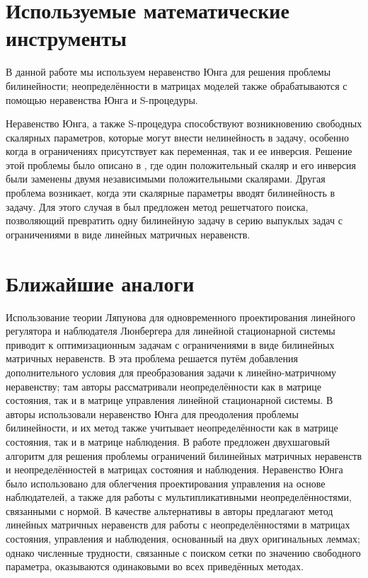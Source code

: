  
\section{Используемые математические инструменты}\label{sec:ch1/sec6}
В данной работе мы используем неравенство Юнга для решения проблемы билинейности; неопределённости в матрицах моделей также обрабатываются с помощью неравенства Юнга и S-процедуры.

Неравенство Юнга, а также S-процедура \cite{Amato2011,LIEN2008} способствуют возникновению свободных скалярных параметров, которые могут внести нелинейность в задачу, особенно когда в ограничениях присутствует как переменная, так и ее инверсия. Решение этой проблемы было описано в \cite{KHELOUFI2016}, где один положительный скаляр и его инверсия были заменены двумя независимыми положительными скалярами. Другая проблема возникает, когда эти скалярные параметры вводят билинейность в задачу. Для этого случая в \cite{KHELOUFI2013} был предложен метод решетчатого поиска, позволяющий превратить одну билинейную задачу в серию выпуклых задач с ограничениями в виде линейных матричных неравенств.

\section{Ближайшие аналоги}\label{sec:ch1/sec7}
Использование теории Ляпунова для одновременного проектирования линейного регулятора и наблюдателя Люнбергера для линейной стационарной системы приводит к оптимизационным задачам с ограничениями в виде билинейных матричных неравенств. В \cite{LIEN2004} эта проблема решается путём добавления дополнительного условия для преобразования задачи к линейно-матричному неравенству; там авторы рассматривали неопределённости как в матрице состояния, так и в матрице управления линейной стационарной системы. В \cite{KHELOUFI2013} авторы использовали неравенство Юнга для преодоления проблемы билинейности, и их метод также учитывает неопределённости как в матрице состояния, так и в матрице наблюдения. В работе \cite{ZEMOUCHE2015} предложен двухшаговый алгоритм для решения проблемы ограничений билинейных матричных неравенств и неопределённостей в матрицах состояния и наблюдения. Неравенство Юнга было использовано для облегчения проектирования управления на основе наблюдателей, а также для работы с мультипликативными неопределённостями, связанными с нормой. В качестве альтернативы в \cite{GRITLI2021} авторы предлагают метод линейных матричных неравенств для работы с неопределённостями в матрицах состояния, управления и наблюдения, основанный на двух оригинальных леммах; однако численные трудности, связанные с поиском сетки по значению свободного параметра, оказываются одинаковыми во всех приведённых методах.
\FloatBarrier
